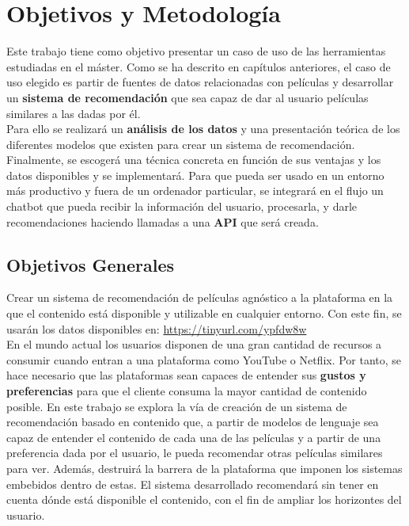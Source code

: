 \chapter{Objetivos y Metodología}\label{chap:objetivos}

Este trabajo tiene como objetivo presentar un caso de uso de las herramientas estudiadas en el máster. Como se ha descrito en capítulos anteriores, el caso de uso elegido es partir de fuentes de datos relacionadas con películas y desarrollar un \textbf{sistema de recomendación} que sea capaz de dar al usuario películas similares a las dadas por él.\\

Para ello se realizará un \textbf{análisis de los datos} y una presentación teórica de los diferentes modelos que existen para crear un sistema de recomendación. Finalmente, se escogerá una técnica concreta en función de sus ventajas y los datos disponibles y se implementará. Para que pueda ser usado en un entorno más productivo y fuera de un ordenador particular, se integrará en el flujo un chatbot que pueda recibir la información del usuario, procesarla, y darle recomendaciones haciendo llamadas a una \textbf{API} que será creada.



\section{Objetivos Generales}\label{sec:objgenerales}

Crear un sistema de recomendación de películas agnóstico a la plataforma en la que el contenido está disponible y utilizable en cualquier entorno. Con este fin, se usarán los datos disponibles en: \url{https://tinyurl.com/ypfdw8w}\\

En el mundo actual los usuarios disponen de una gran cantidad de recursos a consumir cuando entran a una plataforma como YouTube o Netflix. Por tanto, se hace necesario que las plataformas sean capaces de entender sus \textbf{gustos y preferencias} para que el cliente consuma la mayor cantidad de contenido posible. En este trabajo se explora la vía de creación de un sistema de recomendación basado en contenido que, a partir de modelos de lenguaje sea capaz de entender el contenido de cada una de las películas y a partir de una preferencia dada por el usuario, le pueda recomendar otras películas similares para ver. Además, destruirá la barrera de la plataforma que imponen los sistemas embebidos dentro de estas. El sistema desarrollado recomendará sin tener en cuenta dónde está disponible el contenido, con el fin de ampliar los horizontes del usuario.\\

